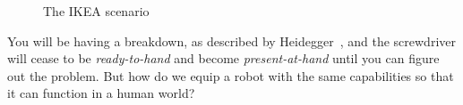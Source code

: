 \documentclass{article}
\begin{document}
\begin{figure}[h]
  \centering
  \qquad
  \caption{The IKEA scenario}
\end{figure}

You will be having a breakdown, as described by Heidegger~\cite{dreyfus07}, and
the screwdriver will cease to be \emph{ready-to-hand} and become
\emph{present-at-hand} until you can figure out the problem. But how do we equip
a robot with the same capabilities so that it can function in a human world?
\end{document}
